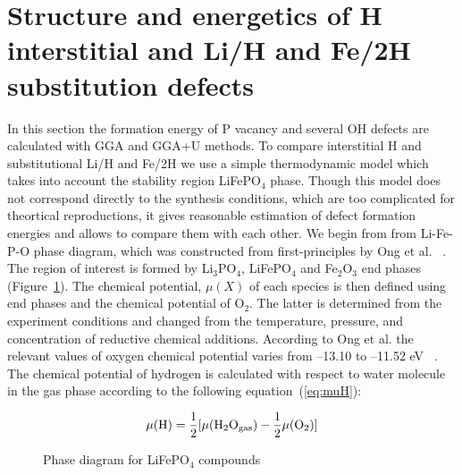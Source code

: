 \section{Structure and energetics of H interstitial and  Li/H and Fe/2H substitution defects}

In this section the formation energy of P vacancy and several OH defects are calculated with GGA and GGA+U methods. To compare interstitial H and substitutional Li/H and Fe/2H we use a simple thermodynamic model which takes into account the stability region LiFePO$_4$ phase. Though this model does not correspond directly to the synthesis conditions, which are too complicated for theortical reproductions, it gives reasonable estimation of defect formation energies and allows to compare them with each other. 
We begin from from Li-Fe-P-O phase diagram, which was constructed from first-principles by Ong et al. ~\cite{ong2008li}. The region of interest is formed by Li$_3$PO$_4$, LiFePO$_4$ and Fe$_2$O$_3$ end phases (Figure~\ref{ris:PhaseD}). The chemical potential, $\mu (X)$ of each species is then defined using end phases and the chemical potential of O$_2$. The latter is determined from the experiment conditions and changed from the temperature, pressure, and concentration of reductive chemical additions. According to Ong et al. the relevant values of oxygen chemical potential varies from --13.10 to --11.52 eV ~\cite{ong2008li}. The chemical potential of hydrogen is calculated with respect to water molecule in the gas phase according to the following equation~(\ref{eq:muH}):

\begin{equation}
    \mu(\rm H)=\frac{1}{2}[\mu(\rm H_2O_{gas})-\frac{1}{2}\mu(\rm O_2)]
\label{eq:muH}
\end{equation}

\begin{figure}[h]
\caption{Phase diagram for LiFePO$_4$ compounds~\cite{ong2008li}}
\label{ris:PhaseD}
\end{figure}

